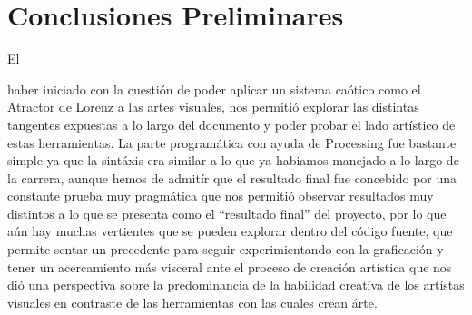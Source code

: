 \documentclass[stu, 12pt, letterpaper, donotrepeattitle, floatsintext]{apa7}
\begin{document}
    \section*{Conclusiones Preliminares}
    El \begin{justifying}
      haber iniciado con la cuestión de poder aplicar un sistema caótico como el Atractor de Lorenz a las artes visuales, nos permitió
    explorar las distintas tangentes expuestas a lo largo del documento y poder probar el lado artístico de estas herramientas. La 
    parte programática con ayuda de Processing fue bastante simple ya que la sintáxis era similar a lo que ya habiamos manejado a lo largo de la carrera,
    aunque hemos de admitír que el resultado final fue concebido por una constante prueba muy pragmática que nos permitió observar resultados muy
    distintos a lo que se presenta como el ``resultado final'' del proyecto, por lo que aún hay muchas vertientes que se pueden explorar dentro del 
    código fuente, que permite sentar un precedente para seguir experimientando con la graficación y tener un acercamiento más visceral ante el proceso
    de creación artística que nos dió una perspectiva sobre la predominancia de la habilidad creatíva de los artístas visuales en contraste de las herramientas
    con las cuales crean árte.\par
    \end{justifying}
    \vspace{\baselineskip}
    
    \newpage   
    \renewcommand\refname{\textbf{Referencias}}
    
    
\end{document}
